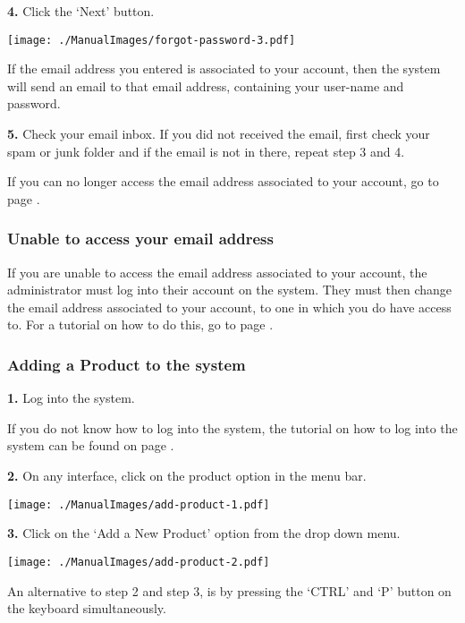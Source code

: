 \textbf{4.} Click the `Next' button.

\texttt{[image: ./ManualImages/forgot-password-3.pdf]}

If the email address you entered is associated to your account, then the system will send an email to that email address, containing your user-name and password.

\textbf{5.} Check your email inbox. If you did not received the email, first check your spam or junk folder and if the email is not in there, repeat step 3 and 4.

If you can no longer access the email address associated to your account, go to page \pageref{fig:Unable to access your email address}.

\pagebreak
\subsubsection{Unable to access your email address}
\label{fig:Unable to access your email address}

If you are unable to access the email address associated to your account, the administrator must log into their account on the system. They must then change the email address associated to your account, to one in which you do have access to. For a tutorial on how to do this, go to page \pageref{fig:Editing an Employee in the system}.

\pagebreak
\subsubsection{Adding a Product to the system}
\label{fig:Adding a Product to the system}

\textbf{1.} Log into the system.

If you do not know how to log into the system, the tutorial on how to log into the system can be found on page \pageref{fig:Logging into the system}.

\textbf{2.} On any interface, click on the product option in the menu bar.

\texttt{[image: ./ManualImages/add-product-1.pdf]}

\textbf{3.} Click on the `Add a New Product' option from the drop down menu.

\texttt{[image: ./ManualImages/add-product-2.pdf]}

An alternative to step 2 and step 3, is by pressing the `CTRL' and `P' button on the keyboard simultaneously.

